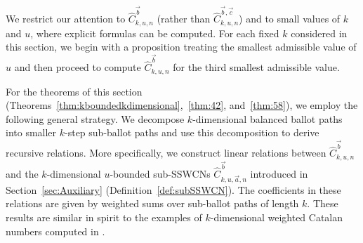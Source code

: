 \documentclass[11pt]{article}
\theoremstyle{remark}
\theoremstyle{definition}
\begin{document}
We restrict our attention to $\widehat{C}_{k,u,n}^{\vec b}$ (rather than $\widehat{C}_{k,u,n}^{\vec b,\vec c}$) and to small values of $k$ and $u$, where explicit formulas can be computed. For each fixed $k$ considered in this section, we begin with a proposition treating the smallest admissible value of $u$ and then proceed to compute  $\widehat{C}_{k,u,n}^{\vec b}$ for the third smallest admissible value.

For the theorems of this section (Theorems~\ref{thm:kboundedkdimensional},~\ref{thm:42}, and~\ref{thm:58}), we employ the following general strategy. We decompose $k$-dimensional balanced ballot paths into smaller $k$-step sub-ballot paths and use this decomposition to derive recursive relations. More specifically, we construct linear relations between $\widehat{C}_{k,u,n}^{\vec{b}}$ and the $k$-dimensional $u$-bounded sub-SSWCNs $\widehat{C}_{k,u,\vec{a},n}^{\vec{b}}$ introduced in Section~\ref{sec:Auxiliary} (Definition~\ref{def:subSSWCN}). The coefficients in these relations are given by weighted sums over sub-ballot paths of length $k$. These results are similar in spirit to the examples of $k$-dimensional weighted Catalan numbers computed in \cite{MR5034574}.
\end{document}

